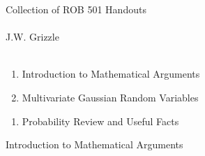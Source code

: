 \documentclass[12pt,letterpaper,headings=normal]{scrartcl}
\begin{document}


\baselineskip=48pt  %

%

\pagestyle{plain}

\vspace*{7cm}


\begin{center}
{\Large 
Collection of ROB 501 Handouts \\
\mbox{ } \\
J.W. Grizzle \\
\mbox{ } 
}
\end{center}


\newpage
{}
\begin{enumerate}
\setlength{\itemsep}{0.1cm}
\item Introduction to Mathematical Arguments
\item Multivariate Gaussian Random Variables
\end{enumerate}

\begin{enumerate}
\setlength{\itemsep}{0.1cm}
\item Probability Review and Useful Facts
\end{enumerate}
\newpage


\newpage
\vspace*{10cm}
{\Large 
\begin{center}
Introduction to Mathematical Arguments
\end{center}
}
\newpage
\end{document}
